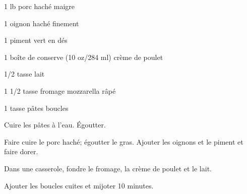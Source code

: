 


\totaltime{}


\begin{ingredients}
    \item 1 lb porc haché maigre
    \item 1 oignon haché finement
    \item 1 piment vert en dés
    \item 1 boîte de conserve (10 oz/284 ml) crème de poulet
    \item 1/2 tasse lait
    \item 1 1/2 tasse fromage mozzarella râpé
    \item 1 tasse pâtes boucles
\end{ingredients}

\begin{steps}
    \item Cuire les pâtes à l'eau. Égoutter.
    \item Faire cuire le porc haché; égoutter le gras. Ajouter les oignons et le piment et faire dorer.
    \item Dans une casserole, fondre le fromage, la crème de poulet et le lait.
    \item Ajouter les boucles cuites et mijoter 10 minutes.
\end{steps}
